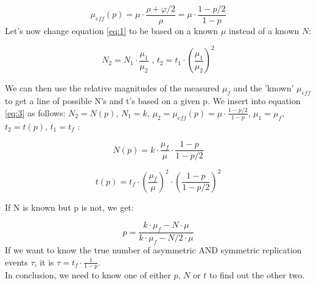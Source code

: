 \documentclass{article}
\numberwithin{equation}{subsection}
\begin{document}
	$$ 
	\mu_{eff}(p) = \mu \cdot \frac{\rho +\varphi/2}{\rho} = \mu \cdot \frac{1 - p/2}{ 1 - p}  
	$$ 
	Let's now change equation \ref{eq:1} to be based on a known $ \mu $ instead of a known $ N $:
	
	\begin{equation}
	N_2 = N_1 \cdot \frac{\mu_1}{\mu_2}  \text{ , } t_2 = t_1 \cdot (\frac{\mu_1}{\mu_2})^2
	\label{eq:3}
	\end{equation}
	
	We can then use the relative magnitudes of the measured $ \mu_f $ and the 'known' $ \mu_{eff}$ to get a line of possible N's and t's based on a given p. We insert into equation \ref{eq:3} as follows: $N_2 = N(p) $, $ N_1 = k$, $ \mu_2 = \mu_{eff}(p) = \mu \cdot \frac{1 - p/2}{ 1 - p}  $, $ \mu_1 = \mu_f$, $t_2 = t(p) $, $ t_1 = t_f$ $ $:
	
	$$
	N(p) = k \cdot \frac{\mu_f}{\mu} \cdot \frac{1 - p}{ 1 - p/2}
	$$
	
	$$
	t(p) = t_f \cdot (\frac{\mu_f}{\mu})^2 \cdot (\frac{1 - p}{ 1 - p/2})^2
	$$
	
	If N is known but p is not, we get:
	
	$$
	p = \frac{k \cdot \mu_f - N \cdot \mu }{k \cdot \mu_f - N/2 \cdot \mu}
	$$
	If we want to know the true number of asymmetric AND symmetric replication events $ \tau $, it is $ \tau = t_f \cdot \frac{1}{1-p}$.\\
	
	In conclusion, we need to know one of either $p$, $N$ or $t$ to find out the other two.
\end{document}
